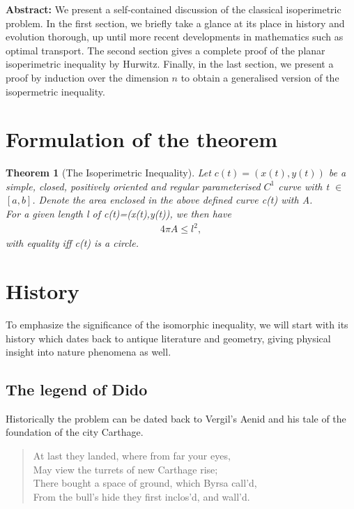 \documentclass[12pt, a4paper, titlepage]{article}
\newtheorem{thm}{Theorem}
\begin{document}

\textbf{Abstract:} We present a self-contained discussion of the classical isoperimetric problem. In the first section, we briefly take a glance at its place in history and evolution thorough, up until more recent developments in mathematics such as optimal transport. The second section gives a complete proof of the planar isoperimetric inequality by Hurwitz. Finally, in the last section, we present a proof by induction over the dimension $n$ to obtain a generalised version of the isopermetric inequality.
\tableofcontents 
\newpage



\section{Formulation of the theorem}
\begin{thm}[The Isoperimetric Inequality]
Let $c(t)=(x(t),y(t))$ be a simple, closed, positively oriented and regular parameterised $C^1$ curve with t $\in$ $[a,b]$. Denote the area enclosed in the above defined curve c(t) with A. \\
For a given length l of c(t)=(x(t),y(t)), we then have
\begin{align*}
4 \pi A \leq l^2,
\end{align*}
with equality iff c(t) is a circle.

\end{thm}
\section{History}
To emphasize the significance of the isomorphic inequality, we will start with its history which dates back to antique literature and geometry, giving physical insight into nature phenomena as well. %
\subsection{The legend of Dido}
Historically the problem can be dated back to Vergil's Aenid and his tale of the foundation of the city Carthage.
\begin{verse}
At last they landed, where from far your eyes,\\
May view the turrets of new Carthage rise;\\
There bought a space of ground, which Byrsa call'd,\\
From the bull's hide they first inclos'd, and wall'd.
\end{verse}
\end{document}
